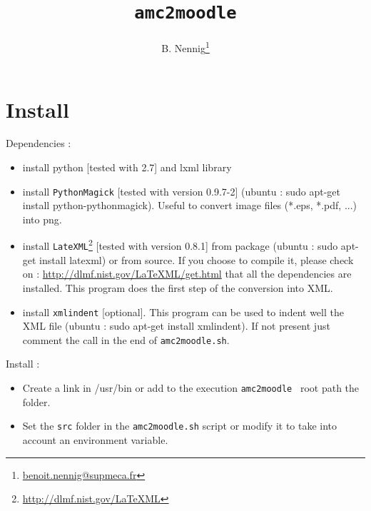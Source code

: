 \documentclass[a4paper]{article}
\title{\texttt{amc2moodle}}
\author{B. Nennig\footnote{\url{benoit.nennig@supmeca.fr}}}
\newcommand{\amc}{\texttt{amc2moodle}}
\begin{document}
\maketitle 

\begin{abstract}
	
\end{abstract}


\tableofcontents	
\newpage
\section{Install}
Dependencies :
\begin{itemize}
	\item install python [tested with 2.7] and lxml library
    \item install \texttt{PythonMagick} [tested with version 0.9.7-2] (ubuntu : sudo apt-get install python-pythonmagick). Useful to convert image files (*.eps, *.pdf, ...) into png.
    \item install \texttt{LateXML}\footnote{\url{http://dlmf.nist.gov/LaTeXML}} [tested with version 0.8.1] from package (ubuntu : sudo apt-get install latexml) or from source. If you choose to compile it, please check on :   
     \url{http://dlmf.nist.gov/LaTeXML/get.html}  that all the dependencies are installed. This program does the first step of the conversion into XML.
    \item install \texttt{xmlindent} [optional]. This program can be used to indent well the XML file (ubuntu : sudo apt-get install xmlindent). If not present just comment the call in the end of \texttt{amc2moodle.sh}.
\end{itemize}



Install :
\begin{itemize}
     \item Create a link in /usr/bin or add to the execution \amc~ root path the folder.
     \item Set the \texttt{src} folder in the \texttt{amc2moodle.sh} script or modify it to take into account an environment variable.
\end{itemize} 
\end{document}
